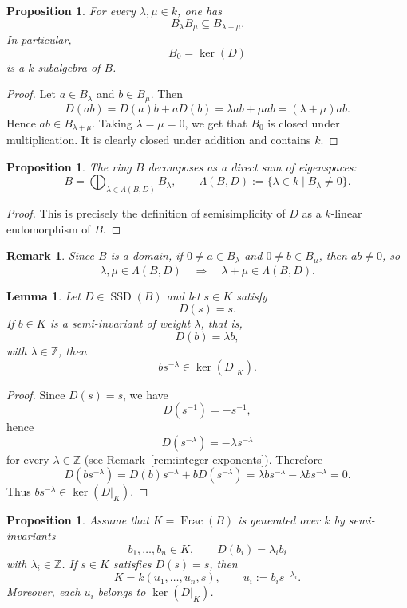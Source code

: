 \documentclass[12pt]{amsart}
\newtheorem{proposition}[theorem]{Proposition}
\newtheorem{lemma}[theorem]{Lemma}
\newtheorem{remark}[theorem]{Remark}
\newcommand{\Z}{\mathbb Z}
\newcommand{\Frac}{\operatorname{Frac}}
\newcommand{\SSD}{\operatorname{SSD}}
\begin{document}
\begin{proposition}
For every $\lambda,\mu\in k$, one has
\[
B_\lambda B_\mu\subseteq B_{\lambda+\mu}.
\]
In particular,
\[
B_0=\ker(D)
\]
is a $k$-subalgebra of $B$.
\end{proposition}

\begin{proof}
Let $a\in B_\lambda$ and $b\in B_\mu$. Then
\[
D(ab)=D(a)b+aD(b)=\lambda ab+\mu ab=(\lambda+\mu)ab.
\]
Hence $ab\in B_{\lambda+\mu}$. Taking $\lambda=\mu=0$, we get that $B_0$ is closed under multiplication.
It is clearly closed under addition and contains $k$.
\end{proof}

\begin{proposition}
The ring $B$ decomposes as a direct sum of eigenspaces:
\[
B=\bigoplus_{\lambda\in \Lambda(B,D)} B_\lambda,
\qquad
\Lambda(B,D):=\{\lambda\in k\mid B_\lambda\neq 0\}.
\]
\end{proposition}

\begin{proof}
This is precisely the definition of semisimplicity of $D$ as a $k$-linear endomorphism of $B$.
\end{proof}

\begin{remark}
Since $B$ is a domain, if $0\neq a\in B_\lambda$ and $0\neq b\in B_\mu$, then $ab\neq 0$, so
\[
\lambda,\mu\in \Lambda(B,D)\quad\Longrightarrow\quad \lambda+\mu\in \Lambda(B,D).
\]
\end{remark}

\begin{lemma}\label{lem:kernel-weighted-element}
Let $D\in \SSD(B)$ and let $s\in K$ satisfy
\[
D(s)=s.
\]
If $b\in K$ is a semi-invariant of weight $\lambda$, that is,
\[
D(b)=\lambda b,
\]
with $\lambda\in \Z$, then
\[
bs^{-\lambda}\in \ker(D|_K).
\]
\end{lemma}

\begin{proof}
Since $D(s)=s$, we have
\[
D(s^{-1})=-s^{-1},
\]
hence
\[
D(s^{-\lambda})=-\lambda s^{-\lambda}
\]
for every $\lambda\in \Z$ (see Remark~\ref{rem:integer-exponents}). Therefore
\[
D(bs^{-\lambda})
=
D(b)s^{-\lambda}+bD(s^{-\lambda})
=
\lambda bs^{-\lambda}-\lambda bs^{-\lambda}=0.
\]
Thus $bs^{-\lambda}\in \ker(D|_K)$.
\end{proof}

\begin{proposition}
Assume that $K=\Frac(B)$ is generated over $k$ by semi-invariants
\[
b_1,\dots,b_n\in K,
\qquad
D(b_i)=\lambda_i b_i
\]
with $\lambda_i\in \Z$. If $s\in K$ satisfies $D(s)=s$, then
\[
K=k(u_1,\dots,u_n,s),
\qquad
u_i:=b_i s^{-\lambda_i}.
\]
Moreover, each $u_i$ belongs to $\ker(D|_K)$.
\end{proposition}
\end{document}
